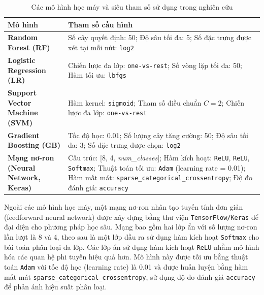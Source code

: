 \begin{table}[htbp]
\caption{Các mô hình học máy và siêu tham số sử dụng trong nghiên cứu}
\label{tab:models}
\centering
\renewcommand{\arraystretch}{1.2}
\begin{tabular}{|l|p{9cm}|}
\hline
\textbf{Mô hình} & \textbf{Tham số cấu hình} \\
\hline
\textbf{Random Forest (RF)} & 
Số cây quyết định: 50; \newline
Độ sâu tối đa: 5; \newline
Số đặc trưng được xét tại mỗi nút: \texttt{log2} \\
\hline
\textbf{Logistic Regression (LR)} & 
Chiến lược đa lớp: \texttt{one-vs-rest}; \newline
Số vòng lặp tối đa: 50; \newline
Hàm tối ưu: \texttt{lbfgs} \\
\hline
\textbf{Support Vector Machine (SVM)} & 
Hàm kernel: \texttt{sigmoid}; \newline
Tham số điều chuẩn $C = 2$; \newline
Chiến lược đa lớp: \texttt{one-vs-rest} \\
\hline
\textbf{Gradient Boosting (GB)} & 
Tốc độ học: 0.01; \newline
Số lượng cây tăng cường: 50; \newline
Độ sâu tối đa: 3; \newline
Số đặc trưng được chọn: \texttt{log2} \\
\hline
\textbf{Mạng nơ-ron (Neural Network, Keras)} & 
Cấu trúc: [8, 4, \textit{num\_classes}]; \newline
Hàm kích hoạt: \texttt{ReLU}, \texttt{ReLU}, \texttt{Softmax}; \newline
Thuật toán tối ưu: \texttt{Adam} (learning rate = 0.01); \newline
Hàm mất mát: \texttt{sparse\_categorical\_crossentropy}; \newline
Độ đo đánh giá: \texttt{accuracy} \\
\hline
\end{tabular}
\end{table}

Ngoài các mô hình học máy, một mạng nơ-ron nhân tạo tuyến tính đơn giản 
(feedforward neural network) được xây dựng bằng thư viện \texttt{TensorFlow/Keras} 
để đại diện cho phương pháp học sâu. 
Mạng bao gồm hai lớp ẩn với số lượng nơ-ron lần lượt là 8 và 4, 
theo sau là một lớp đầu ra sử dụng hàm kích hoạt \texttt{Softmax} cho bài toán phân loại đa lớp. 
Các lớp ẩn sử dụng hàm kích hoạt \texttt{ReLU} nhằm mô hình hóa các quan hệ phi tuyến hiệu quả hơn. 
Mô hình này được tối ưu bằng thuật toán \texttt{Adam} với tốc độ học (learning rate) là 0.01 
và được huấn luyện bằng hàm mất mát \texttt{sparse\_categorical\_crossentropy}, 
sử dụng độ đo đánh giá \texttt{accuracy} để phản ánh hiệu suất phân loại.

